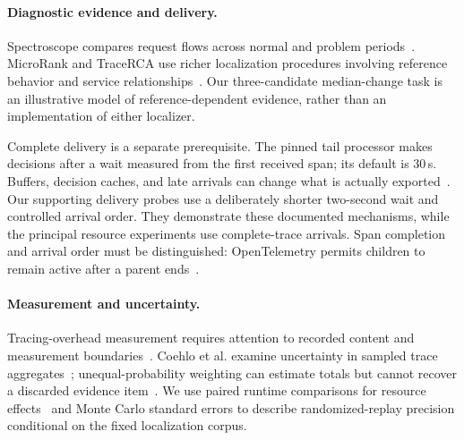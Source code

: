 \paragraph{Diagnostic evidence and delivery.}
Spectroscope compares request flows across normal and problem periods~\cite{sambasivan2011spectroscope}. MicroRank and TraceRCA use richer localization procedures involving reference behavior and service relationships~\cite{yu2021microrank,li2021tracerca}. Our three-candidate median-change task is an illustrative model of reference-dependent evidence, rather than an implementation of either localizer.

Complete delivery is a separate prerequisite. The pinned tail processor makes decisions after a wait measured from the first received span; its default is 30\,s. Buffers, decision caches, and late arrivals can change what is actually exported~\cite{otelTailSampling0136}. Our supporting delivery probes use a deliberately shorter two-second wait and controlled arrival order. They demonstrate these documented mechanisms, while the principal resource experiments use complete-trace arrivals. Span completion and arrival order must be distinguished: OpenTelemetry permits children to remain active after a parent ends~\cite{otelSpanLifecycle}.

\paragraph{Measurement and uncertainty.}
Tracing-overhead measurement requires attention to recorded content and measurement boundaries~\cite{reichelt2026tracingoverhead}. Coehlo et al. examine uncertainty in sampled trace aggregates~\cite{coehlo2012uncertainty}; unequal-probability weighting can estimate totals but cannot recover a discarded evidence item~\cite{HorvitzThompson1952}. We use paired runtime comparisons for resource effects~\cite{nistPairedObservations} and Monte Carlo standard errors to describe randomized-replay precision conditional on the fixed localization corpus.
